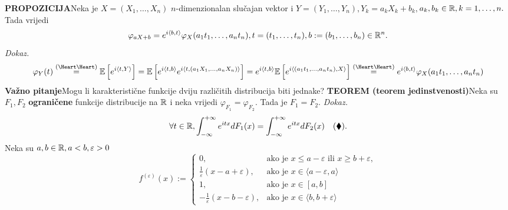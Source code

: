 \documentclass{article}
\begin{document}
\textbf{PROPOZICIJA}\newline Neka je \(X=(X_1,\ldots,X_n)\) \(n\)-dimenzionalan slučajan vektor i \(Y=(Y_1,\ldots,Y_n), Y_k=a_kX_k+b_k,\)\newline\(a_k,b_k\in\Bbb R,k=1,\ldots,n.\) Tada vrijedi \[\varphi_{aX+b}=e^{i\langle b,t\rangle}\varphi_X(a_1t_1,\ldots,a_nt_n),t=(t_1,\ldots,t_n),b:=(b_1,\ldots,b_n)\in\Bbb R^n.\] 
\textit{Dokaz.}\newline
\[\varphi_Y(t)\overset{\text{(\Heart\Heart)}}{=}\Bbb E\left[e^{i\langle t,Y\rangle}\right]=\Bbb E\left[e^{i\langle t,b\rangle}e^{i\langle t,(a_1X_1,\ldots,a_nX_n)\rangle}\right]=e^{i\langle t,b\rangle}\Bbb E\left[e^{i\langle (a_1t_1,\ldots,a_nt_n),X\rangle}\right]\overset{\text{(\Heart\Heart)}}{=}e^{i\langle b,t\rangle}\varphi_X(a_1t_1,\ldots,a_nt_n)\]
\textbf{Važno pitanje}\newline Mogu li karakteristične funkcije dviju različitih distribucija biti jednake?\newline\newline
\textbf{TEOREM (teorem jedinstvenosti)}\newline Neka su \(F_1,F_2\) \textbf{ograničene} funkcije distribucije na \(\Bbb R\) i neka vrijedi \(\varphi_{F_1}=\varphi_{F_2}.\) Tada je \(F_1=F_2.\)\newline\newline
\textit{Dokaz.}
\[\forall t\in\Bbb R,\int_{-\infty}^{+\infty}e^{itx}dF_1(x)=\int_{-\infty}^{+\infty}e^{itx}dF_2(x)\quad(\blacklozenge).\] Neka su \(a,b\in\Bbb R,a<b,\varepsilon>0\) \[f^{(\varepsilon)}(x):=\begin{cases}0,&\text{ako je }x\le a-\varepsilon\text{ ili }x\ge b+\varepsilon,\\\frac1\varepsilon(x-a+\varepsilon),&\text{ako je }x\in\langle a-\varepsilon,a\rangle\\1,&\text{ako je }x\in[a,b]\\-\frac1\varepsilon(x-b-\varepsilon),&\text{ako je }x\in\langle b,b+\varepsilon\rangle\end{cases}\] 
\end{document}
